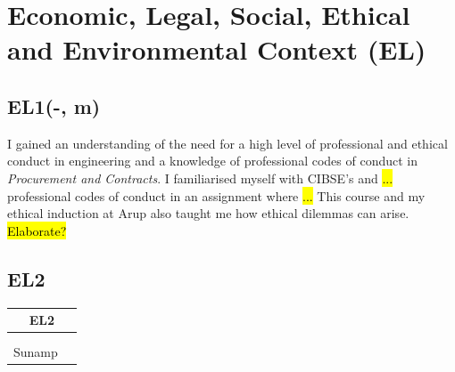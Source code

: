
\section{Economic, Legal, Social, Ethical and Environmental Context (EL)}

\subsection*{EL1(-, m)}

I gained an understanding of the need for a high level of professional and ethical conduct in engineering and a knowledge of professional codes of conduct in \textit{Procurement and Contracts}.
I familiarised myself with CIBSE's and \hl{...} professional codes of conduct in an assignment where \hl{...}
This course and my ethical induction at Arup also taught me how ethical dilemmas can arise.
\hl{Elaborate?}





\subsection*{EL2}

\begin{table}
	\begin{tabular}{|ll|}
		\hline
		\multicolumn{2}{|c|}{\cellcolor[HTML]{F8A102}\textbf{EL2}} \\ \hline
		\ID & \DI \\
		\DST & \SIB \\
		Sunamp &  \\ \hline
	\end{tabular}
\end{table}


